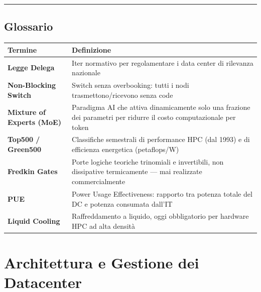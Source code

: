 \documentclass[
  italian,
  openany]{book}
\newcounter{none} %
\begin{document}
\begin{center}\rule{0.5\linewidth}{0.5pt}\end{center}

\section{Glossario}\label{glossario}

{\def\LTcaptype{none} %
\begin{longtable}[]{@{}
  >{\raggedright\arraybackslash}p{}
  >{\raggedright\arraybackslash}p{}@{}}
\toprule\noalign{}
\begin{minipage}[b]{\linewidth}\raggedright
Termine
\end{minipage} & \begin{minipage}[b]{\linewidth}\raggedright
Definizione
\end{minipage} \\
\midrule\noalign{}
\endhead
\bottomrule\noalign{}
\endlastfoot
\textbf{Legge Delega} & Iter normativo per regolamentare i data center
di rilevanza nazionale \\
\textbf{Non-Blocking Switch} & Switch senza overbooking: tutti i nodi
trasmettono/ricevono senza code \\
\textbf{Mixture of Experts (MoE)} & Paradigma AI che attiva
dinamicamente solo una frazione dei parametri per ridurre il costo
computazionale per token \\
\textbf{Top500 / Green500} & Classifiche semestrali di performance HPC
(dal 1993) e di efficienza energetica (petaflops/W) \\
\textbf{Fredkin Gates} & Porte logiche teoriche trinomiali e
invertibili, non dissipative termicamente --- mai realizzate
commercialmente \\
\textbf{PUE} & Power Usage Effectiveness: rapporto tra potenza totale
del DC e potenza consumata dall'IT \\
\textbf{Liquid Cooling} & Raffreddamento a liquido, oggi obbligatorio
per hardware HPC ad alta densità \\
\end{longtable}
}

\newpage

\chapter{Architettura e Gestione dei
Datacenter}\label{architettura-e-gestione-dei-datacenter}
\end{document}
